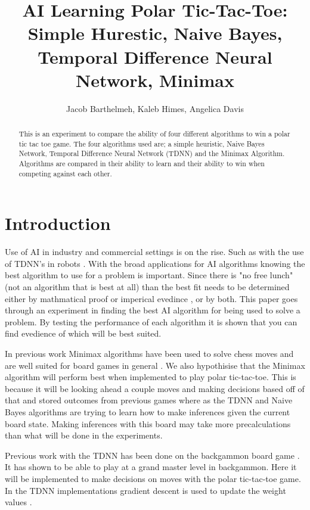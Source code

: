 \documentclass[12pt,letterpaper]{article}
\title{AI Learning Polar Tic-Tac-Toe: \\ Simple Hurestic, Naive Bayes, Temporal Difference Neural Network, Minimax}
\author{Jacob Barthelmeh, Kaleb Himes, Angelica Davis}
\begin{document}
\maketitle

\begin{abstract}
This is an experiment to compare the ability of four different algorithms to win a polar tic tac toe game. The four algorithms used are; a simple heuristic, Naive Bayes Network, Temporal Difference Neural Network (TDNN) and the Minimax Algorithm. Algorithms are compared in their ability to learn and their ability to win when competing against each other.
\end{abstract}

\section{Introduction}
Use of AI in industry and commercial settings is on the rise. Such as with the use of TDNN's in robots \cite{robotTDNN}. With the broad applications for AI algorithms knowing the best algorithm to use for a problem is important. Since there is "no free lunch" (not an algorithm that is best at all) than the best fit needs to be determined either by mathmatical proof or imperical evedince , or by both. This paper goes through an experiment in finding the best AI algorithm for being used to solve a problem. By testing the performance of each algorithm it is shown that you can find evedience of which will be best suited.
 
In previous work Minimax algorithms have been used to solve chess moves and are well suited for board games in general \cite{flyingMinimax}. We also hypothisise that the Minimax algorithm will perform best when implemented to play polar tic-tac-toe. This is because it will be looking ahead a couple moves and making decisions based off of that and stored outcomes from previous games where as the TDNN and Naive Bayes algorithms are trying to learn how to make inferences given the current board state. Making inferences with this board may take more precalculations than what will be done in the experiments.

Previous work with the TDNN has been done on the backgammon board game \cite{stanfordTDNN}. It has shown to be able to play at a grand master level in backgammon. Here it will be implemented to make decisions on moves with the polar tic-tac-toe game. In the TDNN implementations gradient descent is used to update the weight values \cite{gradientTDNN}.
\end{document}
